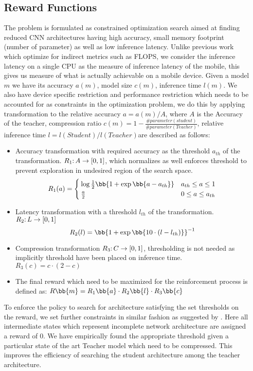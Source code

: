 \documentclass[../main]{subfiles}
\begin{document}
\subsection{Reward Functions}
The problem is formulated as constrained optimization search aimed at finding reduced CNN architectures having high accuracy, small memory footprint (number of parameter) as well as low inference latency.
Unlike previous work which optimize for indirect metrics such as FLOPS, we consider the inference latency on a single CPU as the measure of inference latency of the mobile, this gives us measure of what is actually achievable on a mobile device.
Given a model $m$ we have its accuracy $a(m)$, model size $c(m)$, inference time $l(m)$.
We also have device specific restriction and performance restriction which needs to be accounted for as constraints in the optimization problem, we do this by applying transformation to the relative accuracy $a = a(m)/A$, where $A$ is the Accuracy of the teacher, compression ratio $c(m) =  1 -\frac{\#parameter(student)}{\#parameter(Teacher)}$, relative inference time $l = l(Student)/l(Teacher) $are described as follows:
\begin{itemize}
	\item Accuracy transformation with required accuracy as the threshold $a_{th}$ of the transformation.
	$R_1\mathpunct{:} A \rightarrow [0,1]$, which normalizes as well enforces threshold to prevent exploration in undesired region of the search space.
	\begin{equation}
	    R_1(a) =    \begin{cases}
		                \log \frac{1}{2}\bb{1 + \exp\bb{a-a_{th}}}  &   a_{th} \leq a \leq 1	\\
		                \frac{a}{2}                                 &   0 \leq a \leq a_{th}
		            \end{cases}
	\end{equation}

	\item Latency transformation with a threshold $l_{th}$ of the transformation.
	$R_2\mathpunct{:} L \rightarrow [0,1]$
	\begin{equation}
		R_2(l) =  \inv{\bb{1 + \exp\bb{10 \cdot (l-l_{th})}}}
	\end{equation}

	\item Compression transformation $R_3\mathpunct{:} C \rightarrow [0,1]$, thresholding is not needed as implicitly threshold have been placed on inference time.
	$R_3(c) = c \cdot (2 -c)$
	\item The final reward which need to be maximized for the reinforcement process is defined as:
	$R \bb{m} = R_1 \bb{a} \cdot R_2 \bb{l} \cdot R_3 \bb{c} $
\end{itemize}
To enforce the policy to search for architecture satisfying the set thresholds on the reward, we set further constraints in similar fashion as suggested by \citep{ashok2017n2n}.
Here all intermediate states which represent incomplete network architecture are assigned a reward of 0.
We have empirically found the appropriate threshold given a particular state of the art Teacher model which need to be compressed.
This improves the efficiency of searching the student architecture among the teacher architecture.
\end{document}
